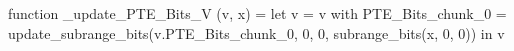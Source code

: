 function _update_PTE_Bits_V (v, x) = let v = { v with PTE_Bits_chunk_0 = update_subrange_bits(v.PTE_Bits_chunk_0, 0, 0, subrange_bits(x, 0, 0)) } in
  v
